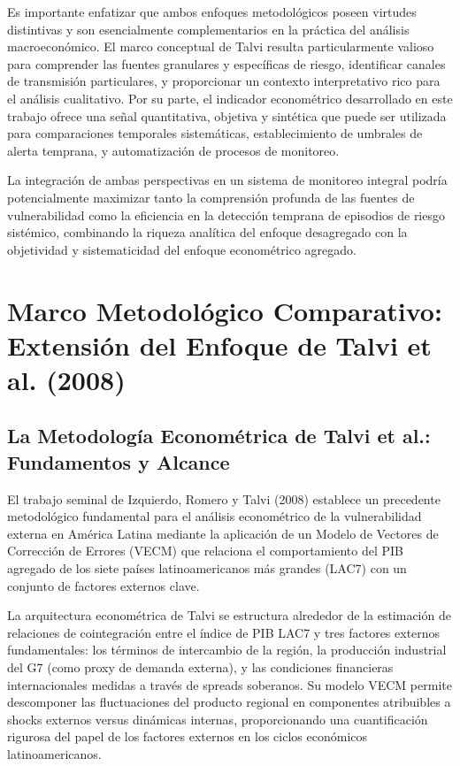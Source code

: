 \documentclass[3p,11pt]{elsarticle}
\begin{document}
Es importante enfatizar que ambos enfoques metodológicos poseen virtudes distintivas y son esencialmente complementarios en la práctica del análisis macroeconómico. El marco conceptual de Talvi resulta particularmente valioso para comprender las fuentes granulares y específicas de riesgo, identificar canales de transmisión particulares, y proporcionar un contexto interpretativo rico para el análisis cualitativo. Por su parte, el indicador econométrico desarrollado en este trabajo ofrece una señal quantitativa, objetiva y sintética que puede ser utilizada para comparaciones temporales sistemáticas, establecimiento de umbrales de alerta temprana, y automatización de procesos de monitoreo.

La integración de ambas perspectivas en un sistema de monitoreo integral podría potencialmente maximizar tanto la comprensión profunda de las fuentes de vulnerabilidad como la eficiencia en la detección temprana de episodios de riesgo sistémico, combinando la riqueza analítica del enfoque desagregado con la objetividad y sistematicidad del enfoque econométrico agregado.

\section{Marco Metodológico Comparativo: Extensión del Enfoque de Talvi et al. (2008)}

\subsection{La Metodología Econométrica de Talvi et al.: Fundamentos y Alcance}

El trabajo seminal de Izquierdo, Romero y Talvi (2008) establece un precedente metodológico fundamental para el análisis econométrico de la vulnerabilidad externa en América Latina mediante la aplicación de un Modelo de Vectores de Corrección de Errores (VECM) que relaciona el comportamiento del PIB agregado de los siete países latinoamericanos más grandes (LAC7) con un conjunto de factores externos clave.

La arquitectura econométrica de Talvi se estructura alrededor de la estimación de relaciones de cointegración entre el índice de PIB LAC7 y tres factores externos fundamentales: los términos de intercambio de la región, la producción industrial del G7 (como proxy de demanda externa), y las condiciones financieras internacionales medidas a través de spreads soberanos. Su modelo VECM permite descomponer las fluctuaciones del producto regional en componentes atribuibles a shocks externos versus dinámicas internas, proporcionando una cuantificación rigurosa del papel de los factores externos en los ciclos económicos latinoamericanos.
\end{document}
